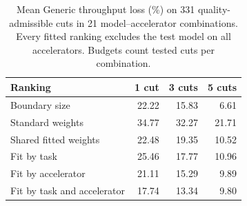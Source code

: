 \begin{table}[!htb]
\centering\small\setlength{\tabcolsep}{3pt}
\caption{Mean Generic throughput loss (\%) on 331 quality-admissible cuts in 21 model--accelerator combinations. Every fitted ranking excludes the test model on all accelerators. Budgets count tested cuts per combination.}
\label{tab:evaluation:generic_graph_budget}

\begin{tabular}{@{}lrrr@{}}
\toprule
Ranking & 1 cut & 3 cuts & 5 cuts \\
\midrule
Boundary size & 22.22 & 15.83 & 6.61 \\
Standard weights & 34.77 & 32.27 & 21.71 \\
Shared fitted weights & 22.48 & 19.35 & 10.52 \\
Fit by task & 25.46 & 17.77 & 10.96 \\
Fit by accelerator & 21.11 & 15.29 & 9.89 \\
Fit by task and accelerator & 17.74 & 13.34 & 9.80 \\
\bottomrule
\end{tabular}
\end{table}
